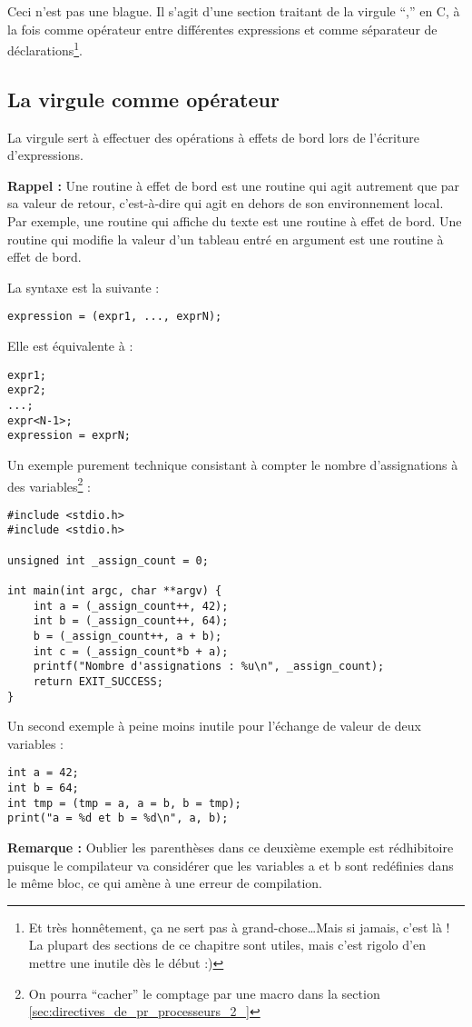 \documentclass[../../../main.tex]{subfiles}
\begin{document}
Ceci n’est pas une blague. Il s’agit d’une section traitant de la virgule ``,'' en C, à la fois comme
opérateur entre différentes expressions et comme séparateur de déclarations\footnote{Et très honnêtement, ça ne sert pas à grand-chose\dots Mais si jamais, c’est là ! La plupart des sections de ce chapitre sont utiles, mais c'est rigolo d'en mettre une inutile dès le début :)}.
\subsection{La virgule comme opérateur}
\label{sub:la_virgule_comme_op_rateur}
La virgule sert à effectuer des opérations à effets de bord lors de l’écriture d’expressions.

\textbf{Rappel :} Une routine à effet de bord est une routine qui agit autrement que par sa valeur de retour,
c’est-à-dire qui agit en dehors de son environnement local. Par exemple, une routine qui affiche du
texte est une routine à effet de bord. Une routine qui modifie la valeur d’un tableau entré en argument
est une routine à effet de bord.

La syntaxe est la suivante :
\begin{verbatim}
expression = (expr1, ..., exprN);
\end{verbatim}
Elle est équivalente à :
\begin{verbatim}
expr1;
expr2;
...;
expr<N-1>;
expression = exprN;
\end{verbatim}
Un exemple purement technique consistant à compter le nombre d’assignations à des variables\footnote{On pourra ``cacher'' le comptage par une macro dans la section \ref{sec:directives_de_pr_processeurs_2_}} :
\begin{verbatim}
#include <stdio.h>
#include <stdio.h>

unsigned int _assign_count = 0;

int main(int argc, char **argv) {
	int a = (_assign_count++, 42);
	int b = (_assign_count++, 64);
	b = (_assign_count++, a + b);
	int c = (_assign_count*b + a);
	printf("Nombre d'assignations : %u\n", _assign_count);
	return EXIT_SUCCESS;
}
\end{verbatim}
Un second exemple à peine moins inutile pour l’échange de valeur de deux variables :
\begin{verbatim}
int a = 42;
int b = 64;
int tmp = (tmp = a, a = b, b = tmp);
print("a = %d et b = %d\n", a, b);
\end{verbatim}
\textbf{Remarque :} Oublier les parenthèses dans ce deuxième exemple est rédhibitoire puisque le compilateur
va considérer que les variables a et b sont redéfinies dans le même bloc, ce qui amène à une erreur de
compilation.
\end{document}

